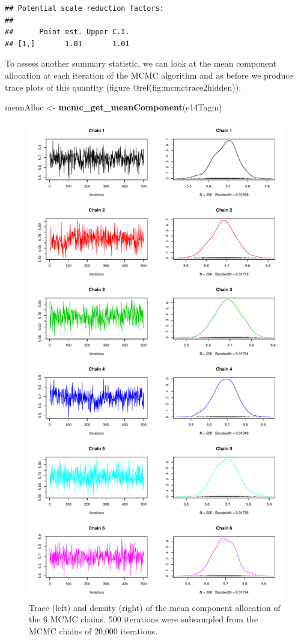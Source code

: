 \documentclass[
]{article}
\newenvironment{Shaded}{\begin{snugshade}}{\end{snugshade}}
\newcommand{\KeywordTok}[1]{\textcolor[rgb]{0.13,0.29,0.53}{\textbf{#1}}}
\newcommand{\NormalTok}[1]{#1}
\newcommand{\StringTok}[1]{\textcolor[rgb]{0.31,0.60,0.02}{#1}}
\begin{document}
\begin{verbatim}
## Potential scale reduction factors:
## 
##      Point est. Upper C.I.
## [1,]       1.01       1.01
\end{verbatim}

To assess another summary statistic, we can look at the mean component
allocation at each iteration of the MCMC algorithm and as before we
produce trace plots of this quantity (figure
@ref(fig:mcmctrace2hidden)).

\begin{Shaded}
\begin{Highlighting}[]
\NormalTok{meanAlloc <-}\StringTok{ }\KeywordTok{mcmc_get_meanComponent}\NormalTok{(e14Tagm)}
\end{Highlighting}
\end{Shaded}

\begin{figure}
\includegraphics[width=0.7\linewidth]{F1000TAGMworkflow_rev1_files/figure-latex/mcmctrace2hidden-1} \caption{Trace (left) and density (right) of the mean component allocation of the 6 MCMC chains. 500 iterations were subsampled from the MCMC chains of 20,000 iterations.}\label{fig:mcmctrace2hidden}
\end{figure}
\end{document}
